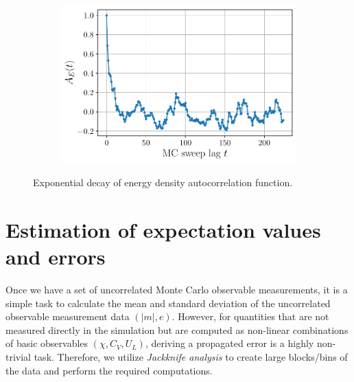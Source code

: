 \documentclass[../journal_main.tex]{subfiles}
\begin{document}
\begin{figure}[!htb]
    \centering
    \begin{subfigure}[b]{0.55\textwidth}  %
        \centering
        \includegraphics[width=\textwidth]{images/monte_carlo/autocorrfn.pdf}
    \end{subfigure}
    \caption{Exponential decay of energy density autocorrelation function.}
    \label{}
\end{figure}
\section{Estimation of expectation values and errors}
Once we have a set of uncorrelated Monte Carlo observable measurements, it is a simple task to calculate the mean and standard deviation of the uncorrelated observable measurement data $(|m|, e)$. However, for quantities that are not measured directly in the simulation but are computed as non-linear combinations of basic observables $(\chi, C_V, U_L)$, deriving a propagated error is a highly non-trivial task. Therefore, we utilize \textit{Jackknife analysis} to create large blocks/bins of the data and perform the required computations.
\end{document}
